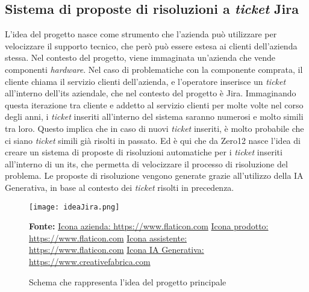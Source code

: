 \subsection{Sistema di proposte di risoluzioni a \textit{ticket} Jira} \label{sec:spiegazioneJira}
L'idea del progetto nasce come strumento che l'azienda può utilizzare per velocizzare il supporto tecnico, che però può essere estesa ai clienti dell'azienda stessa. Nel contesto del progetto, viene immaginata un'azienda che vende componenti \textit{hardware}. 
Nel caso di problematiche con la componente comprata, il cliente chiama il servizio clienti dell'azienda, e l'operatore inserisce un \textit{ticket} all'interno dell'\gls{its} aziendale, che nel contesto del progetto è Jira. Immaginando questa iterazione tra cliente e addetto al servizio clienti per molte volte nel corso degli anni, i \textit{ticket} inseriti all'interno del sistema saranno numerosi e molto simili tra loro. 
Questo implica che in caso di nuovi \textit{ticket} inseriti, è molto probabile che ci siano \textit{ticket} simili già risolti in passato. 
Ed è qui che da Zero12 nasce l'idea di creare un sistema di proposte di risoluzioni automatiche per i \textit{ticket} inseriti all'interno di un \gls{its}, che permetta di velocizzare il processo di risoluzione del problema. Le proposte di risoluzione vengono generate grazie all'utilizzo della IA Generativa, in base al contesto dei \textit{ticket} risolti in precedenza.

\begin{figure}[H]
    \centering
    \texttt{[image: ideaJira.png]}
    \caption{Schema che rappresenta l'idea del progetto principale}
    \small \textbf{Fonte:} \href{https://www.flaticon.com/free-icon/company_4812244}{Icona azienda: https://www.flaticon.com} \href{https://www.flaticon.com/free-icon/box_4601560}{Icona prodotto: https://www.flaticon.com} \href{https://www.flaticon.com/free-icon/assistant_1442194}{Icona assistente: https://www.flaticon.com} \href{https://www.creativefabrica.com/it/product/ai-brain-outline-icon/} {Icona IA Generativa: https://www.creativefabrica.com}

    \label{fig:ideaJira}
\end{figure}
